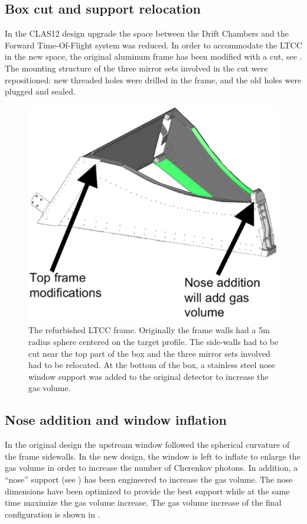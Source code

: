 \subsection{Box cut and support relocation }

In the CLAS12 design upgrade the space between the Drift Chambers and the Forward Time-Of-Flight system was reduced.
In order to accommodate the LTCC in the new space, the original aluminum frame has been modified with a cut, see . The mounting structure
of the three mirror sets involved in the cut were repositioned: new threaded holes were drilled in the frame, and the old holes were plugged and sealed.

\begin{figure}
	\centering
	\includegraphics[width=1.0\columnwidth, height=0.75\columnwidth]{img/boxCut.png}
	\caption{The refurbished LTCC frame. Originally the frame walls had a 5m radius sphere centered on the target profile.
            The side-walls had to be cut near the top part of the box and the three mirror sets involved had to be relocated.
				At the bottom of the box, a stainless steel nose window support was added to the original detector to increase the gas volume.}
	\label{fig:boxCut}
\end{figure}


\subsection{Nose addition and window inflation}

In the original design the upstream window followed the spherical curvature of the frame sidewalls. In the new design, the window is left to inflate
to enlarge the gas volume in order to increase the number of Cherenkov photons. In addition, a ``nose'' support (see ) has been engineered to
increase the gas volume.
The nose dimensions have been optimized to provide the best support while at the same time maximize the gas volume increase. The gas volume increase
of the final configuration is shown in .


